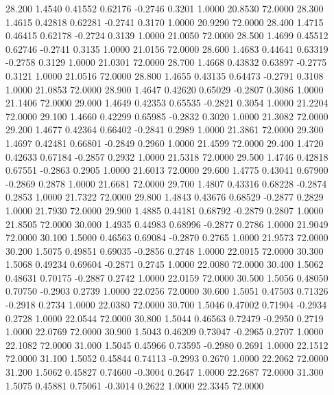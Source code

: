   28.200   1.4540   0.41552   0.62176  -0.2746   0.3201   1.0000  20.8530  72.0000
  28.300   1.4615   0.42818   0.62281  -0.2741   0.3170   1.0000  20.9290  72.0000
  28.400   1.4715   0.46415   0.62178  -0.2724   0.3139   1.0000  21.0050  72.0000
  28.500   1.4699   0.45512   0.62746  -0.2741   0.3135   1.0000  21.0156  72.0000
  28.600   1.4683   0.44641   0.63319  -0.2758   0.3129   1.0000  21.0301  72.0000
  28.700   1.4668   0.43832   0.63897  -0.2775   0.3121   1.0000  21.0516  72.0000
  28.800   1.4655   0.43135   0.64473  -0.2791   0.3108   1.0000  21.0853  72.0000
  28.900   1.4647   0.42620   0.65029  -0.2807   0.3086   1.0000  21.1406  72.0000
  29.000   1.4649   0.42353   0.65535  -0.2821   0.3054   1.0000  21.2204  72.0000
  29.100   1.4660   0.42299   0.65985  -0.2832   0.3020   1.0000  21.3082  72.0000
  29.200   1.4677   0.42364   0.66402  -0.2841   0.2989   1.0000  21.3861  72.0000
  29.300   1.4697   0.42481   0.66801  -0.2849   0.2960   1.0000  21.4599  72.0000
  29.400   1.4720   0.42633   0.67184  -0.2857   0.2932   1.0000  21.5318  72.0000
  29.500   1.4746   0.42818   0.67551  -0.2863   0.2905   1.0000  21.6013  72.0000
  29.600   1.4775   0.43041   0.67900  -0.2869   0.2878   1.0000  21.6681  72.0000
  29.700   1.4807   0.43316   0.68228  -0.2874   0.2853   1.0000  21.7322  72.0000
  29.800   1.4843   0.43676   0.68529  -0.2877   0.2829   1.0000  21.7930  72.0000
  29.900   1.4885   0.44181   0.68792  -0.2879   0.2807   1.0000  21.8505  72.0000
  30.000   1.4935   0.44983   0.68996  -0.2877   0.2786   1.0000  21.9049  72.0000
  30.100   1.5000   0.46563   0.69084  -0.2870   0.2765   1.0000  21.9573  72.0000
  30.200   1.5075   0.49851   0.69035  -0.2856   0.2748   1.0000  22.0015  72.0000
  30.300   1.5068   0.49234   0.69604  -0.2871   0.2745   1.0000  22.0080  72.0000
  30.400   1.5062   0.48631   0.70175  -0.2887   0.2742   1.0000  22.0159  72.0000
  30.500   1.5056   0.48050   0.70750  -0.2903   0.2739   1.0000  22.0256  72.0000
  30.600   1.5051   0.47503   0.71326  -0.2918   0.2734   1.0000  22.0380  72.0000
  30.700   1.5046   0.47002   0.71904  -0.2934   0.2728   1.0000  22.0544  72.0000
  30.800   1.5044   0.46563   0.72479  -0.2950   0.2719   1.0000  22.0769  72.0000
  30.900   1.5043   0.46209   0.73047  -0.2965   0.2707   1.0000  22.1082  72.0000
  31.000   1.5045   0.45966   0.73595  -0.2980   0.2691   1.0000  22.1512  72.0000
  31.100   1.5052   0.45844   0.74113  -0.2993   0.2670   1.0000  22.2062  72.0000
  31.200   1.5062   0.45827   0.74600  -0.3004   0.2647   1.0000  22.2687  72.0000
  31.300   1.5075   0.45881   0.75061  -0.3014   0.2622   1.0000  22.3345  72.0000
